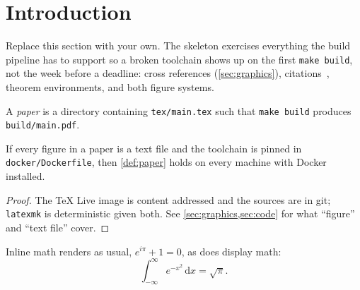\section{Introduction}
\label{sec:introduction}

Replace this section with your own. The skeleton exercises everything the
build pipeline has to support so a broken toolchain shows up on the first
\texttt{make build}, not the week before a deadline: cross references
(\cref{sec:graphics}), citations~\cite{knuth1984texbook,vanzandt1993pstricks},
theorem environments, and both figure systems.

\begin{definition}[Paper]
  \label{def:paper}
  A \emph{paper} is a directory containing \texttt{tex/main.tex} such that
  \texttt{make build} produces \texttt{build/main.pdf}.
\end{definition}

\begin{theorem}
  \label{thm:reproducible}
  If every figure in a paper is a text file and the toolchain is pinned in
  \texttt{docker/Dockerfile}, then \cref{def:paper} holds on every machine with
  Docker installed.
\end{theorem}

\begin{proof}
  The TeX Live image is content addressed and the sources are in git;
  \texttt{latexmk} is deterministic given both. See
  \cref{sec:graphics,sec:code} for what ``figure'' and ``text file'' cover.
\end{proof}

Inline math renders as usual, $e^{i\pi} + 1 = 0$, as does display math:
\begin{equation}
  \label{eq:gauss}
  \int_{-\infty}^{\infty} e^{-x^2}\,\mathrm{d}x = \sqrt{\pi}.
\end{equation}
